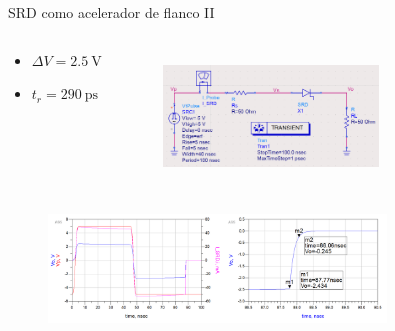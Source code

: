 \documentclass{beamer}
\begin{document}
\begin{frame}{SRD como acelerador de flanco II}

    \begin{columns}[c]
      \begin{block}{}
          \begin{itemize}
              \item $\Delta V = \qty{2.5}{\volt}$
              \item $t_r = \qty{290}{\pico\second}$
          \end{itemize}
      \end{block}
        \begin{figure}
          \centering
            \includegraphics[width=0.7\textwidth]{images/srd_sharpener_circuit.png}
            \label{fig:srd_sharpener}
        \end{figure}
    \end{columns}

    \begin{figure}
        \centering
        \includegraphics[width=0.8\textwidth]{images/srd_sharpener_result.png}
        \label{fig:srd_sharpener_result}
    \end{figure}

\end{frame}
\end{document}
